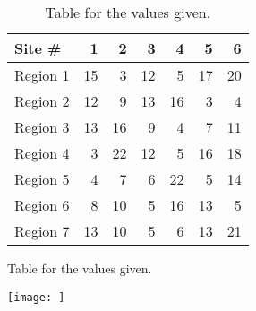 \begin{table}[h!]
    \begin{minipage}{.6\columnwidth}
        \raggedright
        \begin{tabular}{|l|r|r|r|r|r|r|}
            \hline
            Site \#   & 1 &  2 &  3 &  4 &  5 &  6  \\ \hline \hline
            Region 1 &15 &  3 & 12 &  5 & 17 & 20   \\ \hline
            Region 2 &12 &  9 & 13 & 16 &  3 &  4   \\ \hline
            Region 3 &13 & 16 &  9 &  4 &  7 & 11   \\ \hline
            Region 4 & 3 & 22 & 12 &  5 & 16 & 18   \\ \hline
            Region 5 & 4 &  7 &  6 & 22 &  5 & 14   \\ \hline
            Region 6 & 8 & 10 &  5 & 16 & 13 &  5   \\ \hline
            Region 7 &13 & 10 &  5 &  6 & 13 & 21   \\ \hline
        \end{tabular}
        \caption{Table for the values given.}
        \label{tab:q21}
    \end{minipage}%
    \begin{minipage}{.5\columnwidth}
        \centering
        \texttt{[image: ]}
        \caption{Table for the values given.}
        \label{tab:q22}
    \end{minipage}
\end{table}

